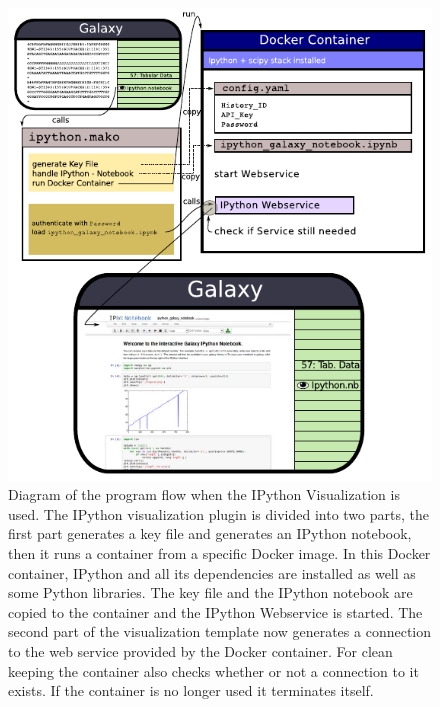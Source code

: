 \documentclass{bioinfo}
\begin{document}
\begin{methods}
\begin{figure}[!tpb]
\centerline{\includegraphics{diagram.pdf}}
\caption{Diagram of the program flow when the IPython Visualization is used. The IPython visualization plugin is divided into two parts, the first part generates a key file and generates an IPython notebook, then it runs a container from a specific Docker image. In this Docker container, IPython and all its dependencies are installed as well as some Python libraries. The key file and the IPython notebook are copied to the container and the IPython Webservice is started. The second part of the visualization template now generates a connection to the web service provided by the Docker container. For clean keeping the container also checks whether or not a connection to it exists. If the container is no longer used it terminates itself.}
\label{fig:diagram}
\end{figure}


\end{methods}


%
%
\end{document}
